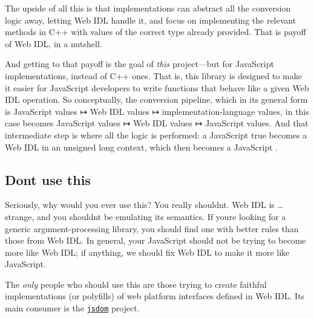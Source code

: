 The upside of all this is that implementations can abstract all the conversion logic away, letting Web I\+DL handle it, and focus on implementing the relevant methods in C++ with values of the correct type already provided. That is payoff of Web I\+DL, in a nutshell.

And getting to that payoff is the goal of {\itshape this} project—but for Java\+Script implementations, instead of C++ ones. That is, this library is designed to make it easier for Java\+Script developers to write functions that behave like a given Web I\+DL operation. So conceptually, the conversion pipeline, which in its general form is Java\+Script values ↦ Web I\+DL values ↦ implementation-\/language values, in this case becomes Java\+Script values ↦ Web I\+DL values ↦ Java\+Script values. And that intermediate step is where all the logic is performed\+: a Java\+Script {\ttfamily true} becomes a Web I\+DL {} in an unsigned long context, which then becomes a Java\+Script {}.

\subsection*{Don\textquotesingle{}t use this}

Seriously, why would you ever use this? You really shouldn\textquotesingle{}t. Web I\+DL is … strange, and you shouldn\textquotesingle{}t be emulating its semantics. If you\textquotesingle{}re looking for a generic argument-\/processing library, you should find one with better rules than those from Web I\+DL. In general, your Java\+Script should not be trying to become more like Web I\+DL; if anything, we should fix Web I\+DL to make it more like Java\+Script.

The {\itshape only} people who should use this are those trying to create faithful implementations (or polyfills) of web platform interfaces defined in Web I\+DL. Its main consumer is the \href{https://github.com/tmpvar/jsdom}{\tt jsdom} project. 